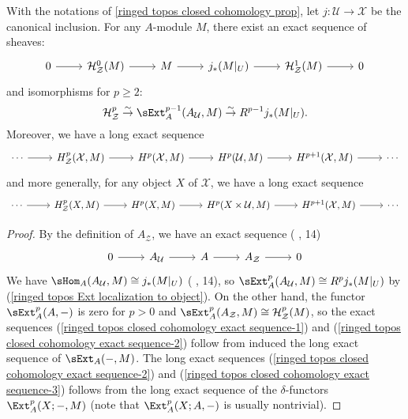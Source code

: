 \begin{proposition}\label{ringed topos closed cohomology exact sequence}
With the notations of \cref{ringed topos closed cohomology prop}, let $j:\mathcal{U}\to \mathcal{X}$ be the canonical inclusion. For any $A$-module $M$, there exist an exact sequence of sheaves:
\begin{equation}\label{ringed topos closed cohomology exact sequence-1}
\begin{tikzcd}
0\ar[r]&\mathcal{H}^0_\mathcal{Z}(M)\ar[r]&M\ar[r]&j_*(M|_U)\ar[r]&\mathcal{H}^1_\mathcal{Z}(M)\ar[r]&0
\end{tikzcd}
\end{equation}
and isomorphisms for $p\geq 2$:
\begin{equation}\label{ringed topos closed cohomology exact sequence-2}
\mathcal{H}^p_\mathcal{Z} \stackrel{\sim}{\to } \sExt_A^{p-1}(A_\mathcal{U},M) \stackrel{\sim}{\to } R^{p-1}j_*(M|_U).
\end{equation}
Moreover, we have a long exact sequence
\begin{equation}\label{ringed topos closed cohomology exact sequence-3}
\begin{tikzcd}
\cdots\ar[r]&H^p_\mathcal{Z}(\mathcal{X},M)\ar[r]&H^p(\mathcal{X},M)\ar[r]&H^p(\mathcal{U},M)\ar[r]&H^{p+1}(\mathcal{X},M)\ar[r]&\cdots
\end{tikzcd}
\end{equation}
and more generally, for any object $X$ of $\mathcal{X}$, we have a long exact sequence
\begin{equation}\label{ringed topos closed cohomology exact sequence-4}
\begin{tikzcd}
\cdots\ar[r]&H^p_\mathcal{Z}(X,M)\ar[r]&H^p(X,M)\ar[r]&H^p(X\times\mathcal{U},M)\ar[r]&H^{p+1}(\mathcal{X},M)\ar[r]&\cdots
\end{tikzcd}
\end{equation}
\end{proposition}
\begin{proof}
By the definition of $A_\mathcal{Z}$, we have an exact sequence (\cite{SGA4-1} , 14)
\begin{equation}\label{ringed topos closed cohomology exact sequence-5}
\begin{tikzcd}
0\ar[r]&A_\mathcal{U}\ar[r]&A\ar[r]&A_\mathcal{Z}\ar[r]&0
\end{tikzcd}
\end{equation}
We have $\sHom_A(A_\mathcal{U},M)\cong j_*(M|_U)$ (\cite{SGA4-1} , 14), so $\sExt_A^p(A_\mathcal{U},M)\cong R^pj_*(M|_U)$ by (\ref{ringed topos Ext localization to object}). On the other hand, the functor $\sExt_A^p(A,-)$ is zero for $p>0$ and $\sExt_A^p(A_\mathcal{Z},M)\cong\mathcal{H}^p_\mathcal{Z}(M)$, so the exact sequences (\ref{ringed topos closed cohomology exact sequence-1}) and (\ref{ringed topos closed cohomology exact sequence-2}) follow from induced the long exact sequence of $\sExt_A(-,M)$. The long exact sequences (\ref{ringed topos closed cohomology exact sequence-2}) and (\ref{ringed topos closed cohomology exact sequence-3}) follows from the long exact sequence of the $\delta$-functors $\Ext_A^p(X;-,M)$ (note that $\Ext_A^p(X;A,-)$ is usually nontrivial).
\end{proof}

